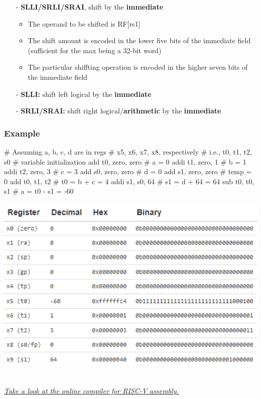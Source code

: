 \documentclass[12pt,openany]{book}
\begin{document}
  \begin{itemize}
    \item[-] \textbf{SLLI/SRLI/SRAI}, shift by the \textbf{immediate}
    \begin{itemize}
        \item The operand to be shifted is RF[rs1]
        \item The shift amount is encoded in the lower five bits of the immediate field (sufficient for the max being a 32-bit word)
        \item The particular shiffting operation is encoded in the higher seven bits of the immediate field
    \end{itemize}
    \item[-] \textbf{SLLI:} shift left logical by the \textbf{immediate}
    \item[-] \textbf{SRLI/SRAI:} shift right logical/\textbf{arithmetic} by the \textbf{immediate}
\end{itemize}

\subsubsection{Example}
\begin{minipage}[htp]{0.45\textwidth}
\begin{assembly}
# Assuming a, b, c, d are in regs
# x5, x6, x7, x8, respectively
# i.e., t0, t1, t2, s0
# variable initialization
add t0, zero, zero # a = 0
addi t1, zero, 1 # b = 1
addi t2, zero, 3 # c = 3
add s0, zero, zero # d = 0
add s1, zero, zero # temp = 0
add t0, t1, t2 # t0 = b + c = 4
addi s1, s0, 64 # s1 = d + 64 = 64
sub t0, t0, s1 # a = t0 - s1 = -60
\end{assembly}
\end{minipage}
\hfill
\vline
\hfill
\begin{minipage}[htp]{0.45\textwidth}
	\begin{center}
		\includegraphics[width=1.2\textwidth]{circuits/20.1.2_5.png}
	\end{center}
\end{minipage}\\
\textit{\href{https://www.cs.cornell.edu/courses/cs3410/2019sp/riscv/interpreter/}{Take a look at the online compiler for RISC-V assembly.} }
\end{document}
